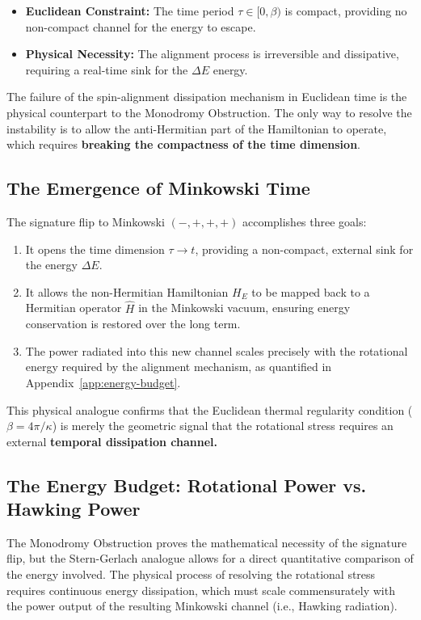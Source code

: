 \documentclass[11pt]{article}
\begin{document}
\begin{itemize}
    \item \textbf{Euclidean Constraint:} The time period $\tau \in [0,\beta)$ is compact, providing no non-compact channel for the energy to escape.
    \item \textbf{Physical Necessity:} The alignment process is irreversible and dissipative, requiring a real-time sink for the $\Delta E$ energy.
\end{itemize}

The failure of the spin-alignment dissipation mechanism in Euclidean time is the physical counterpart to the Monodromy Obstruction. The only way to resolve the instability is to allow the anti-Hermitian part of the Hamiltonian to operate, which requires \textbf{breaking the compactness of the time dimension}.

\subsection{The Emergence of Minkowski Time}

The signature flip to Minkowski $(-,+,+,+)$ accomplishes three goals:
\begin{enumerate}
    \item It opens the time dimension $\tau \to t$, providing a non-compact, external sink for the energy $\Delta E$.
    \item It allows the non-Hermitian Hamiltonian $H_E$ to be mapped back to a Hermitian operator $\widehat{H}$ in the Minkowski vacuum, ensuring energy conservation is restored over the long term.
    \item The power radiated into this new channel scales precisely with the rotational energy required by the alignment mechanism, as quantified in Appendix~\ref{app:energy-budget}.
\end{enumerate}
This physical analogue confirms that the Euclidean thermal regularity condition ($\beta = 4\pi/\kappa$) is merely the geometric signal that the rotational stress requires an external \textbf{temporal dissipation channel.}

\subsection{The Energy Budget: Rotational Power vs. Hawking Power}\label{sec:energy-balance}

The Monodromy Obstruction proves the mathematical necessity of the signature flip, but the Stern-Gerlach\cite{SternGerlach1922} analogue allows for a direct quantitative comparison of the energy involved. The physical process of resolving the rotational stress requires continuous energy dissipation, which must scale commensurately with the power output of the resulting Minkowski channel (i.e., Hawking radiation\cite{Hawking1975}).
\end{document}
